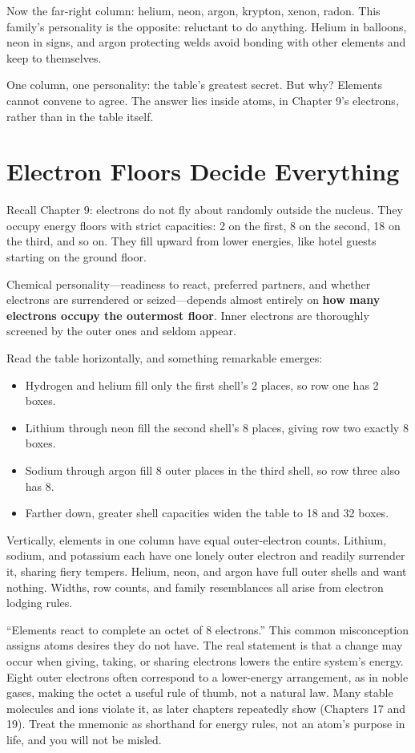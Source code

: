 Now the far-right column: helium, neon, argon, krypton, xenon, radon. This family's personality is the opposite: reluctant to do anything. Helium in balloons, neon in signs, and argon protecting welds avoid bonding with other elements and keep to themselves.

One column, one personality: the table's greatest secret. But why? Elements cannot convene to agree. The answer lies inside atoms, in Chapter 9's electrons, rather than in the table itself.

\section{Electron Floors Decide Everything}

Recall Chapter 9: electrons do not fly about randomly outside the nucleus. They occupy energy floors with strict capacities: 2 on the first, 8 on the second, 18 on the third, and so on. They fill upward from lower energies, like hotel guests starting on the ground floor.

Chemical personality---readiness to react, preferred partners, and whether electrons are surrendered or seized---depends almost entirely on \textbf{how many electrons occupy the outermost floor}. Inner electrons are thoroughly screened by the outer ones and seldom appear.

Read the table horizontally, and something remarkable emerges:

\begin{itemize}[itemsep=2pt]
\item Hydrogen and helium fill only the first shell's 2 places, so row one has 2 boxes.
\item Lithium through neon fill the second shell's 8 places, giving row two exactly 8 boxes.
\item Sodium through argon fill 8 outer places in the third shell, so row three also has 8.
\item Farther down, greater shell capacities widen the table to 18 and 32 boxes.
\end{itemize}

Vertically, elements in one column have equal outer-electron counts. Lithium, sodium, and potassium each have one lonely outer electron and readily surrender it, sharing fiery tempers. Helium, neon, and argon have full outer shells and want nothing. Widths, row counts, and family resemblances all arise from electron lodging rules.

\begin{wuqu}
``Elements react to complete an octet of 8 electrons.'' This common misconception assigns atoms desires they do not have. The real statement is that a change may occur when giving, taking, or sharing electrons lowers the entire system's energy. Eight outer electrons often correspond to a lower-energy arrangement, as in noble gases, making the octet a useful rule of thumb, not a natural law. Many stable molecules and ions violate it, as later chapters repeatedly show (Chapters 17 and 19). Treat the mnemonic as shorthand for energy rules, not an atom's purpose in life, and you will not be misled.
\end{wuqu}

